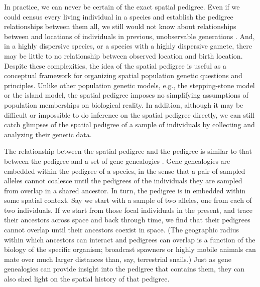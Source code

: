 \documentclass{ar-1col}
\newcommand{\g}[1]{{\color{blue}{#1}}}
\begin{document}
In practice, we can never be certain of the exact spatial pedigree.
Even if we could census every living individual in a species
and establish the pedigree relationships between them all,
we still would not know about relationships between
and locations of individuals in previous, unobservable generations \citep{wilkins2004separationoftimescales}.
And, in a highly dispersive species,
or a species with a highly dispersive gamete,
there may be little to no relationship between observed location and birth location.
Despite these complexities,
the idea of the spatial pedigree is useful
as a conceptual framework for organizing
spatial population genetic questions and principles.
Unlike other population genetic models,
e.g., the stepping-stone model or the island model,
the spatial pedigree imposes no simplifying
assumptions of population memberships on biological reality.
In addition, although it may be difficult or impossible
to do inference on the spatial pedigree directly,
we can still catch glimpses of the spatial pedigree of a sample of individuals
by collecting and analyzing their genetic data.

\g{keep or not? \{}
The relationship between the spatial pedigree and the pedigree
is similar to that between the pedigree and a set of gene genealogies \citep{rasmussen2014argweaver}.
Gene genealogies are embedded within the pedigree of a species,
in the sense that a pair of sampled alleles cannot coalesce until
the pedigrees of the individuals they are sampled from overlap in a shared ancestor.
In turn, the pedigree is in embedded within some spatial context.
Say we start with a sample of two alleles, one from each of two individuals.
If we start from those focal individuals in the present,
and trace their ancestors across space and back through time,
we find that their pedigrees cannot overlap until their ancestors coexist in space.
(The geographic radius within which ancestors can interact
and pedigrees can overlap is a function of the biology of the specific organism;
broadcast spawners or highly mobile animals can mate over much larger distances than, say, terrestrial snails.)
Just as gene genealogies can provide insight into the pedigree that contains them,
they can also shed light on the spatial history of that pedigree. \g{\}}
\end{document}
